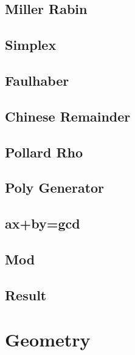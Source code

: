 \documentclass[10pt,twocolumn,oneside]{article}
\begin{document}
\subsection{Miller Rabin}


\subsection{Simplex}


\newpage

\subsection{Faulhaber}


\subsection{Chinese Remainder}


\subsection{Pollard Rho}


\subsection{Poly Generator}


\subsection{ax+by=gcd}


\subsection{Mod}


\subsection{Result}



\section{Geometry}
\end{document}
